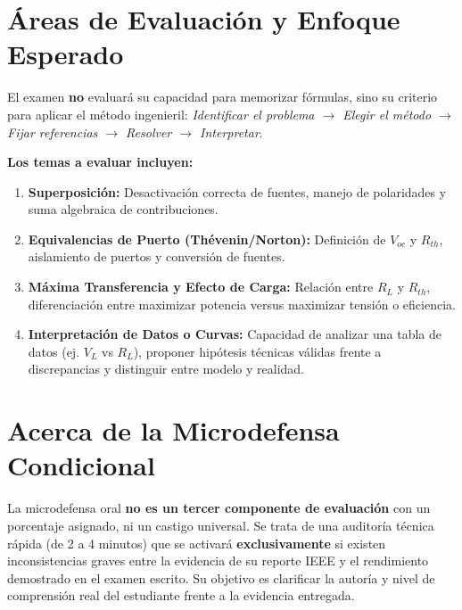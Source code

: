 \documentclass[11pt, a4paper]{article}
\begin{document}
\section*{Áreas de Evaluación y Enfoque Esperado}
El examen \textbf{no} evaluará su capacidad para memorizar fórmulas, sino su criterio para aplicar el método ingenieril: \textit{Identificar el problema $\rightarrow$ Elegir el método $\rightarrow$ Fijar referencias $\rightarrow$ Resolver $\rightarrow$ Interpretar}.

\textbf{Los temas a evaluar incluyen:}
\begin{enumerate}
    \item \textbf{Superposición:} Desactivación correcta de fuentes, manejo de polaridades y suma algebraica de contribuciones.
    \item \textbf{Equivalencias de Puerto (Thévenin/Norton):} Definición de $V_{oc}$ y $R_{th}$, aislamiento de puertos y conversión de fuentes.
    \item \textbf{Máxima Transferencia y Efecto de Carga:} Relación entre $R_L$ y $R_{th}$, diferenciación entre maximizar potencia versus maximizar tensión o eficiencia.
    \item \textbf{Interpretación de Datos o Curvas:} Capacidad de analizar una tabla de datos (ej. $V_L$ vs $R_L$), proponer hipótesis técnicas válidas frente a discrepancias y distinguir entre modelo y realidad.
\end{enumerate}

\section*{Acerca de la Microdefensa Condicional}
La microdefensa oral \textbf{no es un tercer componente de evaluación} con un porcentaje asignado, ni un castigo universal. Se trata de una auditoría técnica rápida (de 2 a 4 minutos) que se activará \textbf{exclusivamente} si existen inconsistencias graves entre la evidencia de su reporte IEEE y el rendimiento demostrado en el examen escrito. Su objetivo es clarificar la autoría y nivel de comprensión real del estudiante frente a la evidencia entregada.
\end{document}
